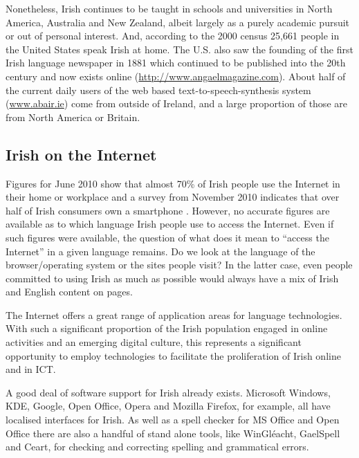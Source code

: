 \begin{multicols}{2}
Nonetheless, Irish continues to be taught in schools and universities in North America, Australia and New Zealand, albeit largely as a purely academic pursuit or out of personal interest. And, according to the 2000 census 25,661 people in the United States speak Irish at home. The U.S. also saw the founding of the first Irish language newspaper in 1881 which continued to be published into the 20th century and now exists online (\url{http://www.angaelmagazine.com}). About half of the current daily users of the web based text-to-speech-synthesis system (\url{www.abair.ie}) come from outside of Ireland, and a large proportion of those are from North America or Britain.

\subsection{Irish on the Internet}

Figures for June 2010 show that almost 70\% of Irish people use the Internet in their home or workplace \cite{internetstats} and a survey from November 2010 indicates that over half of Irish consumers own a smartphone \cite{mindshare}. However, no accurate figures are available as to which language Irish people use to access the Internet. Even if such figures were available, the question of what does it mean to ``access the Internet'' in a given language remains. Do we look at the language of the browser/operating system or the sites people visit? In the latter case, even people committed to using Irish as much as possible would always have a mix of Irish and English content on pages.

The Internet offers a great range of application areas for language technologies. With such a significant proportion of the Irish population engaged in online activities and an emerging digital culture, this represents a significant opportunity to employ technologies to facilitate the proliferation of Irish online and in ICT.

A good deal of software support for Irish already exists. Microsoft Windows, KDE, Google, Open Office, Opera and Mozilla Firefox, for example, all have localised interfaces for Irish. As well as a spell checker for MS Office and Open Office there are also a handful of stand alone tools, like WinGléacht, GaelSpell and Ceart, for checking and correcting spelling and grammatical errors. 



\end{multicols}
